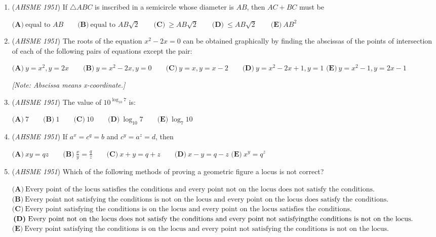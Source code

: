 \begin{enumerate}
	\item (\textit{AHSME 1951}) If $\triangle ABC$ is inscribed in a semicircle whose diameter is $AB$, then $AC+BC$ must be 


 $\textbf{(A)}\ \text{equal to }AB\qquad\textbf{(B)}\ \text{equal to }AB\sqrt{2}\qquad\textbf{(C)}\ \geq AB\sqrt{2}\qquad\textbf{(D)}\ \leq AB\sqrt{2} \qquad \textbf{(E)}\ AB^{2}$


	\item (\textit{AHSME 1951}) The roots of the equation $x^{2}-2x = 0$ can be obtained graphically by finding the abscissas of the points of intersection of each of the following pairs of equations except the pair: 


 $\textbf{(A)}\ y = x^{2}, y = 2x\qquad\textbf{(B)}\ y = x^{2}-2x, y = 0\qquad\textbf{(C)}\ y = x, y = x-2\qquad\textbf{(D)}\ y = x^{2}-2x+1, y = 1$
$\textbf{(E)}\ y = x^{2}-1, y = 2x-1$


 \textit{[Note: Abscissa means x-coordinate.]}


 

	\item (\textit{AHSME 1951}) The value of $10^{\log_{10}7}$ is: 


 $\textbf{(A)}\ 7\qquad\textbf{(B)}\ 1\qquad\textbf{(C)}\ 10\qquad\textbf{(D)}\ \log_{10}7\qquad\textbf{(E)}\ \log_{7}10$


	\item (\textit{AHSME 1951}) If $a^{x}= c^{q}= b$ and $c^{y}= a^{z}= d$, then


 $\textbf{(A)}\ xy = qz\qquad\textbf{(B)}\ \frac{x}{y}=\frac{q}{z}\qquad\textbf{(C)}\ x+y = q+z\qquad\textbf{(D)}\ x-y = q-z$
$\textbf{(E)}\ x^{y}= q^{z}$


	\item (\textit{AHSME 1951}) Which of the following methods of proving a geometric figure a locus is not correct? 


 $\textbf{(A)}\ \text{Every point of the locus satisfies the conditions and every point not on the locus does not satisfy the conditions.}$
$\textbf{(B)}\ \text{Every point not satisfying the conditions is not on the locus and every point on the locus does satisfy the conditions.}$
$\textbf{(C)}\ \text{Every point satisfying the conditions is on the locus and every point on the locus satisfies the conditions.}$
$\textbf{(D)}\ \text{Every point not on the locus does not satisfy the conditions and every point not satisfying}\\ \text{the conditions is not on the locus.}$
$\textbf{(E)}\ \text{Every point satisfying the conditions is on the locus and every point not satisfying the conditions is not on the locus.}$



\end{enumerate}
